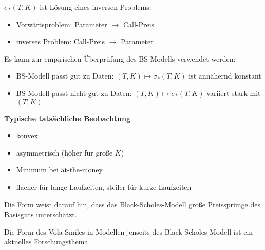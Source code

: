 \begin{*bemerkung_inline}
	$\sigma_\ast(T,K)$ ist Lösung eines inversen Problems:
	\begin{itemize}[nolistsep, topsep=-\parskip]
		\item Vorwärtsproblem: Parameter $\to$ Call-Preis
		\item inverses Problem: Call-Preis $\to$ Parameter
	\end{itemize}
	Es kann zur empirischen Überprüfung des BS-Modells verwendet werden:
	\begin{itemize}[nolistsep, topsep=-\parskip]
		\item BS-Modell passt gut zu Daten: $(T,K) \mapsto \sigma_\ast(T,K)$ ist annähernd konstant
		\item BS-Modell passt nicht gut zu Daten: $(T,K) \mapsto \sigma_\ast(T,K)$ variiert stark mit $(T,K)$
	\end{itemize}
\end{*bemerkung_inline}

\textbf{Typische tatsächliche Beobachtung }
\begin{itemize}[nolistsep, topsep=-\parskip]
	\item konvex
	\item asymmetrisch (höher für große $K$)
	\item Minimum bei at-the-money
	\item flacher für lange Laufzeiten, steiler für kurze Laufzeiten
\end{itemize}

Die Form weist darauf hin, dass das Black-Scholes-Modell große Preissprünge des Basisguts unterschätzt.

Die Form des Vola-Smiles in Modellen jenseits des Black-Scholes-Modell ist ein aktuelles Forschungsthema.